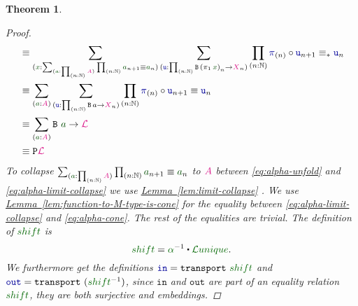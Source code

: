 \documentclass[twoside,11pt,openright]{report}
\theoremstyle{plain} %
\newtheorem{thm}{Theorem}[section]
\theoremstyle{definition}
\theoremstyle{remark}
\newcommand*{\lemref}[1]{\hyperref[lem:#1]{Lemma~\ref*{lem:#1}}}
\newcommand*{\term}[1]{\textcolor{green!30!black}{#1}} %
\newcommand*{\pathterm}[1]{\textcolor{green!40!black}{#1}}
\newcommand*{\type}[1]{\textcolor{magenta!90!black}{#1}}
\newcommand*{\function}[1]{\textcolor{blue!60!black}{\ensuremath{\mathtt{#1}}}}
\newcommand*{\typeformer}[1]{\ensuremath{\mathtt{#1}}}
\newcommand*{\functor}[1]{\ensuremath{\mathbf{\mathtt{#1}}}}
\newcommand{\ct}{%
  \mathchoice{\mathbin{\raisebox{0.5ex}{$\displaystyle\centerdot$}}}%
             {\mathbin{\raisebox{0.5ex}{$\centerdot$}}}%
             {\mathbin{\raisebox{0.25ex}{$\scriptstyle\,\centerdot\,$}}}%
             {\mathbin{\raisebox{0.1ex}{$\scriptscriptstyle\,\centerdot\,$}}}
}
\newcommand*{\sym}[1]{\ensuremath{#1^{-1}}}
\begin{document}
\begin{thm}
\begin{proof}
\begin{align}
      &\equiv \sum_{(\term{x} : \sum_{(\term{a} : \prod_{(n : \mathbb{N})} \type{A})} \prod_{(n : \mathbb{N})} \term{a}_{n+1} \equiv \term{a}_n)} \sum_{(\function{u} : \prod_{(n : \mathbb{N})} \typeformer{B}\,{(\pi_1\,\term{x})}_n \rightarrow \type{X}_n)} \prod_{(n : \mathbb{N})} \function{\pi}_{(n)} \circ \function{u}_{n+1} \equiv_* \function{u}_n \label{eq:alpha-unfold} \\
      &\equiv \sum_{(\term{a} : \type{A})} \sum_{(\function{u} : \prod_{(n : \mathbb{N})} \typeformer{B}\,a \rightarrow \type{X}_n)} \prod_{(n : \mathbb{N})} \function{\pi}_{(n)} \circ \function{u}_{n+1} \equiv \function{u}_n \label{eq:alpha-limit-collapse} \\
      &\equiv \sum_{(\term{a} : \type{A})} \typeformer{B}~\term{a} \rightarrow \type{\mathcal{L}} \label{eq:alpha-cone}\\
      &\equiv \functor{P}\type{\mathcal{L}}
    \end{align}
    To collapse \(\sum_{(\term{a} : \prod_{(n : \mathbb{N})} \type{A})} \prod_{(n : \mathbb{N})} \term{a}_{n+1} \equiv \term{a}_n\) to \(\type{A}\) between \eqref{eq:alpha-unfold} and \eqref{eq:alpha-limit-collapse} we use \lemref{limit-collapse} . We use \lemref{function-to-M-type-is-cone} for the equality between \eqref{eq:alpha-limit-collapse} and \eqref{eq:alpha-cone}. The rest of the equalities are trivial. The definition of \(\pathterm{shift}\) is
    \begin{equation}
      \pathterm{shift} = \sym{\pathterm{\alpha}} \ct \pathterm{\mathcal{L}unique}.
    \end{equation}
    We furthermore get the definitions \(\function{in} = \mathtt{transport}~\pathterm{shift}\) and \(\function{out} = \mathtt{transport}~(\sym{\pathterm{shift}})\), since \function{in} and \function{out} are part of an equality relation \(\pathterm{shift}\), they are both surjective and embeddings. 
  \end{proof}
\end{thm}
\end{document}

